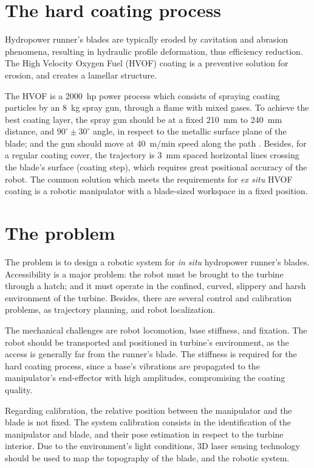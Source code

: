 \section{The hard coating process}\label{hvof}

Hydropower runner's blades are typically eroded by cavitation and abrasion
phenomena, resulting in hydraulic profile deformation, thus efficiency
reduction. The High Velocity Oxygen Fuel (HVOF) coating is a preventive
solution for erosion, and creates a lamellar structure. 

The HVOF is a 2000~hp power process which consists of
spraying coating particles by an 8~kg spray gun, through a flame with mixed
gases. To achieve the best coating layer, the spray gun should be at a fixed
210~mm to 240~mm distance, and $90^\circ \pm 30^\circ$ angle, in respect to the
metallic surface plane of the blade; and the gun should move at 40~m/min speed
along the path \cite{li2002effect}.  Besides, for a regular coating cover, the
trajectory is 3~mm spaced horizontal lines crossing the blade's surface (coating step), which requires great positional accuracy of the robot.
The common solution which meets the requirements for \textit{ex situ} HVOF
coating is a robotic manipulator with a blade-sized workspace in a fixed position.

\section{The problem}\label{problem}

The problem is to design a robotic system for \textit{in situ}
hydropower runner's blades. Accessibility is a major problem: the robot must be
brought to the turbine through a hatch; and it must operate in the confined,
curved, slippery and harsh environment of the turbine. Besides, there are
several control and calibration problems, as trajectory planning, and robot localization.

The mechanical challenges are robot locomotion, base stiffness, and
fixation. The robot should be transported and positioned in turbine's
environment, as the access is generally far from the runner's blade.
The stiffness is required for the hard coating process, since a base's
vibrations are propagated to the manipulator's end-effector with high
amplitudes, compromising the coating quality. 

Regarding calibration, the relative position between the manipulator and the
blade is not fixed. The system calibration consists in the identification of
the manipulator and blade, and their pose estimation in respect to the turbine
interior. Due to the environment's light conditions, 3D laser sensing
technology should be used to map the topography of the blade, and the robotic
system. 

